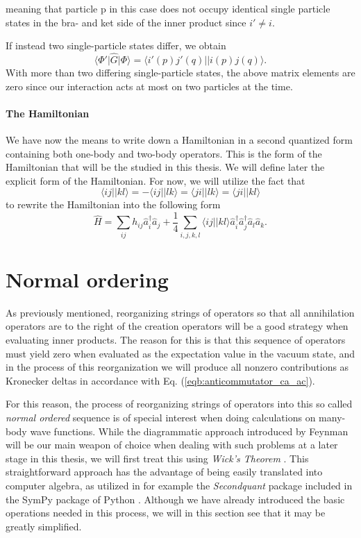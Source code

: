 meaning that particle p in this case does not occupy identical single particle states in the bra- and ket side of the inner product since $i' \neq i$.

If instead two single-particle states differ, we obtain
\begin{equation}
\langle \Phi' \vert \hat{G} \vert \Phi \rangle = \langle i'(p) j'(q) \vert \vert i(p) j(q) \rangle.
\label{eqn:antisymmetric_element_3}
\end{equation}
With more than two differing single-particle states, the above matrix elements are zero since our interaction acts at most on two particles at the time. 

\paragraph{The Hamiltonian}

We have now the means to write down a Hamiltonian in a second
quantized form containing both one-body and two-body operators. This
is the form of the Hamiltonian that will be the studied in this
thesis. We will define later the explicit form of the Hamiltonian.
For now, we will utilize the fact that
$$ \langle ij \vert \vert kl \rangle =  -\langle ij \vert \vert lk \rangle = \langle ji \vert \vert lk \rangle =  \langle ji \vert \vert kl \rangle$$
to rewrite the Hamiltonian into the following form
\begin{equation}
\hat{H} = \sum_{ij} h_{ij} \hat{a}_i^{\dagger} \hat{a}_j + \frac{1}{4} \sum_{i,j,k,l} \langle ij \vert \vert kl \rangle \hat{a}_{i}^{\dagger}\hat{a}_{j}^{\dagger} \hat{a}_{l} \hat{a}_k.
\label{eqn:2nq_hamiltonian}
\end{equation}

\section{Normal ordering}

As previously mentioned, reorganizing strings of operators so that all annihilation operators are to the right of the creation operators will be a good strategy when evaluating inner products. The reason for this is that this sequence of operators must yield zero when evaluated as the expectation value in the vacuum state, and in the process of this reorganization we will produce all nonzero contributions as Kronecker deltas in accordance with Eq. (\ref{eqb:anticommutator_ca_ac}). 

For this reason, the process of reorganizing strings of operators into this so called \emph{normal ordered} sequence is of special interest when doing calculations on many-body wave functions. While the diagrammatic approach introduced by Feynman \cite{ShavittBartlett2009} will be our main weapon of choice when dealing with such problems at a later stage in this thesis, we will first treat this using \emph{Wick's Theorem} \cite{Wick1950}. This straightforward approach has the advantage of being easily translated into computer algebra, as utilized in for example the \emph{Secondquant} package included in the SymPy package of Python \cite{secondquant}. Although we have already introduced the basic operations needed in this process, we will in this section see that it may be greatly simplified.

